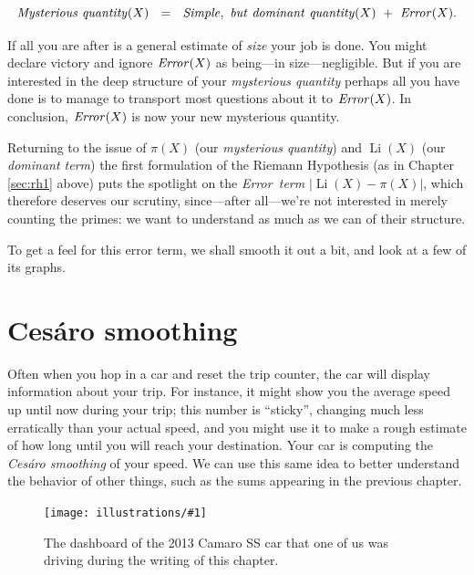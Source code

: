 \documentclass[openany]{book}
\DeclareMathOperator{\Li}{Li}
\newcommand{\ill}[3]{%
   \begin{figure}[H]%
   \vspace{-2ex}
   \centering%
   \texttt{[image: illustrations/\#1]}%
   \caption{#3}%
   \vspace{-2ex}
    \end{figure}}
\theoremstyle{plain}
\theoremstyle{definition}
\begin{document}
 $${\it Mysterious\  quantity}(X)\ \ = \ \ {\it Simple, \ but \ dominant\ quantity}(X) \ + \ {\it Error}(X).$$

 If all you are after is a general estimate of {\it size}  your job is done. You might declare victory and ignore ${\it Error}(X)$ as being---in size---negligible. But if you are interested in the deep structure of your {\it mysterious quantity} perhaps all you have done is to manage to transport most questions about it to  ${\it Error}(X)$. In conclusion, ${\it Error}(X)$ is now your new mysterious quantity.

 Returning to the issue of $\pi(X)$ (our {\it mysterious quantity}) and $\Li(X)$ (our {\it dominant term}) the first formulation of the Riemann Hypothesis  (as in Chapter \ref{sec:rh1} above)  puts the spotlight on the {\it Error\ term} $|\Li(X) - \pi(X)|$, which therefore deserves our scrutiny, since---after all---we're not interested in merely counting the primes: we want to understand as much as we can of their structure.

   To get a feel for this error term, we shall smooth it out a bit, and look at a few of its graphs.


\chapter{Ces\'aro smoothing}\label{ces}

Often when you hop in a car and reset the trip counter, the car
will display information about your trip.  For instance, it might show you the
average speed up until now during your trip; this number
is ``sticky'', changing much less erratically than your
actual speed, and you might use it to make a rough estimate of
how long until you will reach your destination.
Your car is computing the {\em Ces\'aro smoothing }of your speed.
We can use this same idea to better understand the behavior
of other things, such as the sums appearing in
the previous chapter.
\ill{camaro}{.7}{The dashboard of the 2013 Camaro SS car that one of us was driving during the writing of this chapter.}
\end{document}
